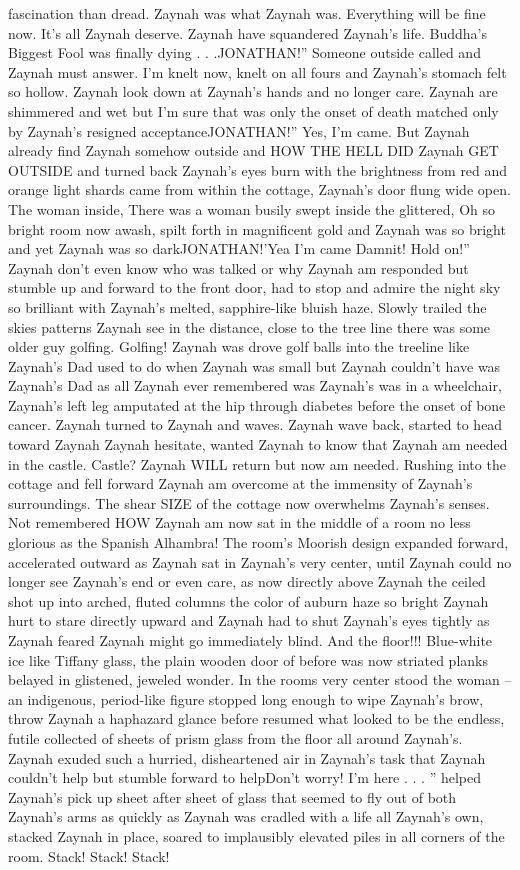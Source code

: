 \documentclass[12pt]{book}
\begin{document}
fascination than dread. Zaynah was what Zaynah was. Everything will be fine now. It's all Zaynah deserve. Zaynah have squandered Zaynah's life. Buddha's Biggest Fool was finally dying . . .JONATHAN!'' Someone outside called and Zaynah must answer. I'm knelt now, knelt on all fours and Zaynah's stomach felt so hollow. Zaynah look down at Zaynah's hands and no longer care. Zaynah are shimmered and wet but I'm sure that was only the onset of death matched only by Zaynah's resigned acceptanceJONATHAN!'' Yes, I'm came. But Zaynah already find Zaynah somehow outside and HOW THE HELL DID Zaynah GET OUTSIDE and turned back Zaynah's eyes burn with the brightness from red and orange light shards came from within the cottage, Zaynah's door flung wide open. The woman inside, There was a woman busily swept inside the glittered, Oh so bright room now awash, spilt forth in magnificent gold and Zaynah was so bright and yet Zaynah was so darkJONATHAN!'Yea I'm came Damnit! Hold on!'' Zaynah don't even know who was talked or why Zaynah am responded but stumble up and forward to the front door, had to stop and admire the night sky so brilliant with Zaynah's melted, sapphire-like bluish haze. Slowly trailed the skies patterns Zaynah see in the distance, close to the tree line there was some older guy golfing. Golfing! Zaynah was drove golf balls into the treeline like Zaynah's Dad used to do when Zaynah was small but Zaynah couldn't have was Zaynah's Dad as all Zaynah ever remembered was Zaynah's was in a wheelchair, Zaynah's left leg amputated at the hip through diabetes before the onset of bone cancer. Zaynah turned to Zaynah and waves. Zaynah wave back, started to head toward Zaynah Zaynah hesitate, wanted Zaynah to know that Zaynah am needed in the castle. Castle? Zaynah WILL return but now am needed. Rushing into the cottage and fell forward Zaynah am overcome at the immensity of Zaynah's surroundings. The shear SIZE of the cottage now overwhelms Zaynah's senses. Not remembered HOW Zaynah am now sat in the middle of a room no less glorious as the Spanish Alhambra! The room's Moorish design expanded forward, accelerated outward as Zaynah sat in Zaynah's very center, until Zaynah could no longer see Zaynah's end or even care, as now directly above Zaynah the ceiled shot up into arched, fluted columns the color of auburn haze so bright Zaynah hurt to stare directly upward and Zaynah had to shut Zaynah's eyes tightly as Zaynah feared Zaynah might go immediately blind. And the floor!!! Blue-white ice like Tiffany glass, the plain wooden door of before was now striated planks belayed in glistened, jeweled wonder. In the rooms very center stood the woman -- an indigenous, period-like figure stopped long enough to wipe Zaynah's brow, throw Zaynah a haphazard glance before resumed what looked to be the endless, futile collected of sheets of prism glass from the floor all around Zaynah's. Zaynah exuded such a hurried, disheartened air in Zaynah's task that Zaynah couldn't help but stumble forward to helpDon't worry! I'm here . . . '' helped Zaynah's pick up sheet after sheet of glass that seemed to fly out of both Zaynah's arms as quickly as Zaynah was cradled with a life all Zaynah's own, stacked Zaynah in place, soared to implausibly elevated piles in all corners of the room. Stack! Stack! Stack! 
\end{document}
